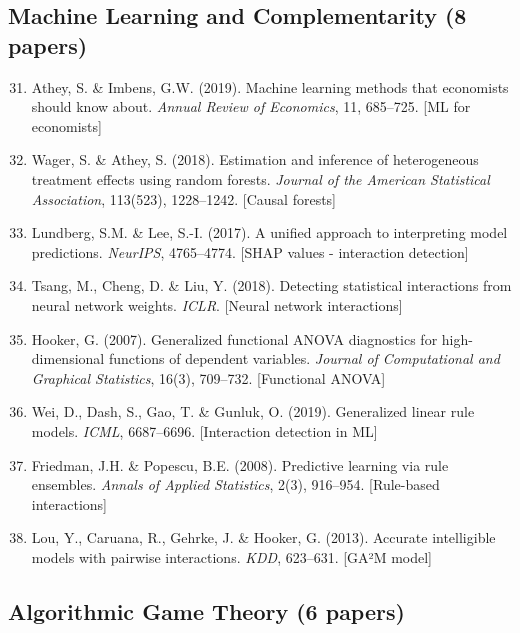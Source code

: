 \subsection{Machine Learning and Complementarity (8 papers)}

\begin{enumerate}
    \setcounter{enumi}{30}
    \item Athey, S. \& Imbens, G.W. (2019). Machine learning methods that economists should know about. \textit{Annual Review of Economics}, 11, 685--725. [ML for economists]

    \item Wager, S. \& Athey, S. (2018). Estimation and inference of heterogeneous treatment effects using random forests. \textit{Journal of the American Statistical Association}, 113(523), 1228--1242. [Causal forests]

    \item Lundberg, S.M. \& Lee, S.-I. (2017). A unified approach to interpreting model predictions. \textit{NeurIPS}, 4765--4774. [SHAP values - interaction detection]

    \item Tsang, M., Cheng, D. \& Liu, Y. (2018). Detecting statistical interactions from neural network weights. \textit{ICLR}. [Neural network interactions]

    \item Hooker, G. (2007). Generalized functional ANOVA diagnostics for high-dimensional functions of dependent variables. \textit{Journal of Computational and Graphical Statistics}, 16(3), 709--732. [Functional ANOVA]

    \item Wei, D., Dash, S., Gao, T. \& Gunluk, O. (2019). Generalized linear rule models. \textit{ICML}, 6687--6696. [Interaction detection in ML]

    \item Friedman, J.H. \& Popescu, B.E. (2008). Predictive learning via rule ensembles. \textit{Annals of Applied Statistics}, 2(3), 916--954. [Rule-based interactions]

    \item Lou, Y., Caruana, R., Gehrke, J. \& Hooker, G. (2013). Accurate intelligible models with pairwise interactions. \textit{KDD}, 623--631. [GA²M model]
\end{enumerate}

\subsection{Algorithmic Game Theory (6 papers)}

